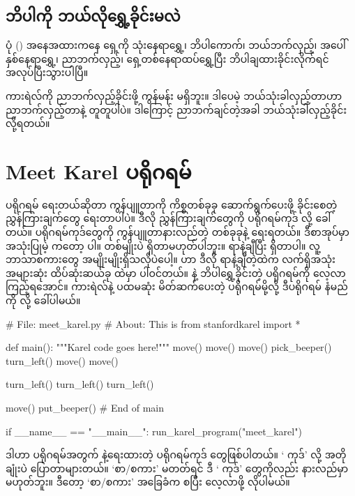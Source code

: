 \subsection*{ဘိပါကို ဘယ်လိုရွှေ့ခိုင်းမလဲ}
ပုံ (\fRefNo{\ref{fig:meet_karel_1}}) အနေအထားကနေ ရှေ့ကို သုံးနေရာရွှေ့၊ ဘိပါကောက်၊ ဘယ်ဘက်လှည့်၊ အပေါ် နှစ်နေရာရွှေ့၊ ညာဘက်လှည့်၊ ရှေ့တစ်နေရာထပ်ရွှေ့ပြီး ဘိပါချထားခိုင်းလိုက်ရင် အလုပ်ပြီးသွားပါပြီ။

ကားရဲလ်ကို ညာဘက်လှည့်ခိုင်းဖို့  ကွန်မန်း မရှိဘူး။ ဒါပေမဲ့ ဘယ်သုံးခါလှည့်တာဟာ ညာဘက်လှည့်တာနဲ့ တူတူပါပဲ။ ဒါကြောင့် ညာဘက်ချင်တဲ့အခါ ဘယ်သုံးခါလှည့်ခိုင်းလို့ရတယ်။

\section{Meet Karel ပရိုဂရမ်}
ပရိုဂရမ် ရေးတယ်ဆိုတာ ကွန်ပျူတာကို ကိစ္စတစ်ခုခု ဆောက်ရွက်ပေးဖို့ ခိုင်းစေတဲ့  ညွှန်ကြားချက်တွေ ရေးတာပါပဲ။ ဒီလို ညွှန်ကြားချက်တွေကို ပရိုဂရမ်ကုဒ်  လို့ ခေါ်တယ်။ ပရိုဂရမ်ကုဒ်တွေကို ကွန်ပျူတာနားလည်တဲ့  တစ်ခုခုနဲ့ ရေးရတယ်။ ဒီစာအုပ်မှာ အသုံးပြုမဲ့  ကတော့  ပါ။  တစ်မျိုးပဲ ရှိတာမဟုတ်ပါဘူး။ ရာနဲ့ချီပြီး ရှိတာပါ။ လူ့ဘာသာစကားတွေ အမျိုးမျိုးရှိသလိုပဲပေါ့။  ဟာ ဒီလို ရာနဲ့ချီတဲ့ထဲက လက်ရှိအသုံးအများဆုံး ထိပ်ဆုံးဆယ်ခု ထဲမှာ ပါဝင်တယ်။  နဲ့ ဘိပါရွှေ့ခိုင်းတဲ့ ပရိုဂရမ်ကို လေ့လာကြည့်ရအောင်။ ကားရဲလ်နဲ့ ပထမဆုံး မိတ်ဆက်ပေးတဲ့ ပရိုဂရမ်မို့လို့ ဒီပရိုဂရမ် နံမည်ကို  လို့ ခေါ်ပါမယ်။
%
\begin{py}
# File: meet_karel.py
# About: This is
from stanfordkarel import *

def main():
    """Karel code goes here!"""
    move()
    move()
    move()
    pick_beeper()
    turn_left()
    move()
    move()

    turn_left()
    turn_left()
    turn_left()

    move()
    put_beeper()
# End of main

if __name__ == "__main__":
    run_karel_program("meet_karel")
\end{py}
%

ဒါဟာ  ပရိုဂရမ်အတွက်  နဲ့ရေးထားတဲ့ ပရိုဂရမ်ကုဒ် တွေဖြစ်ပါတယ်။ ‘ ကုဒ်’ လို့ အတိုချုံးပဲ ပြောတာများတယ်။  ‘စာ/စကား’ မတတ်ရင် ဒီ ‘ ကုဒ်’ တွေကိုလည်း နားလည်မှာ မဟုတ်ဘူး။ ဒီတော့  ‘စာ/စကား’ အခြေခံက စပြီး လေ့လာဖို့ လိုပါမယ်။

